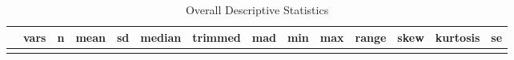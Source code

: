 \documentclass[]{article}
\begin{document}
\begin{longtable}[]{@{}lrrrrrrrrrrrrr@{}}
\caption{Overall Descriptive Statistics}\tabularnewline
\toprule
\begin{minipage}[b]{0.09\columnwidth}\raggedright
\strut
\end{minipage} & \begin{minipage}[b]{0.03\columnwidth}\raggedleft
vars\strut
\end{minipage} & \begin{minipage}[b]{0.02\columnwidth}\raggedleft
n\strut
\end{minipage} & \begin{minipage}[b]{0.06\columnwidth}\raggedleft
mean\strut
\end{minipage} & \begin{minipage}[b]{0.06\columnwidth}\raggedleft
sd\strut
\end{minipage} & \begin{minipage}[b]{0.04\columnwidth}\raggedleft
median\strut
\end{minipage} & \begin{minipage}[b]{0.05\columnwidth}\raggedleft
trimmed\strut
\end{minipage} & \begin{minipage}[b]{0.04\columnwidth}\raggedleft
mad\strut
\end{minipage} & \begin{minipage}[b]{0.02\columnwidth}\raggedleft
min\strut
\end{minipage} & \begin{minipage}[b]{0.02\columnwidth}\raggedleft
max\strut
\end{minipage} & \begin{minipage}[b]{0.03\columnwidth}\raggedleft
range\strut
\end{minipage} & \begin{minipage}[b]{0.06\columnwidth}\raggedleft
skew\strut
\end{minipage} & \begin{minipage}[b]{0.07\columnwidth}\raggedleft
kurtosis\strut
\end{minipage} & \begin{minipage}[b]{0.05\columnwidth}\raggedleft
se\strut
\end{minipage}\tabularnewline
\midrule
\endfirsthead
\toprule
\begin{minipage}[b]{0.09\columnwidth}\raggedright
\strut
\end{minipage} & \begin{minipage}[b]{0.03\columnwidth}\raggedleft

\end{minipage}
\end{longtable}
\end{document}
